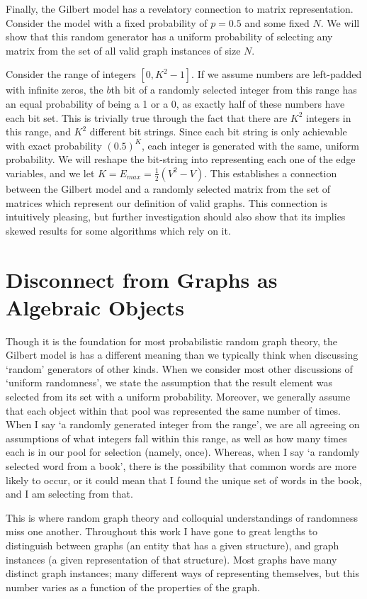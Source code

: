 \documentclass[11pt,a4paper]{report}
\begin{document}
Finally, the Gilbert model has a revelatory connection to matrix representation.
Consider the model with a fixed probability of $p=0.5$ and some fixed $N$.
We will show that this random generator has a uniform probability of selecting any matrix from the set of all valid graph instances of size $N$.

Consider the range of integers $[0, K^2 - 1]$.
If we assume numbers are left-padded with infinite zeros, the $b$th bit of a randomly selected integer from this range has an equal probability of being a 1 or a 0, as exactly half of these numbers have each bit set.
This is trivially true through the fact that there are $K^2$ integers in this range, and $K^2$ different bit strings.
Since each bit string is only achievable with exact probability $(0.5)^K$, each integer is generated with the same, uniform probability.
We will reshape the bit-string into representing each one of the edge variables, and we let $K = E_{max} = \frac{1}{2}(V^2 - V)$.
This establishes a connection between the Gilbert model and a randomly selected matrix from the set of matrices which represent our definition of valid graphs. 
This connection is intuitively pleasing, but further investigation should also show that its implies skewed results for some algorithms which rely on it.

\section{Disconnect from Graphs as Algebraic Objects}

Though it is the foundation for most probabilistic random graph theory, the Gilbert model is has a different meaning than we typically think when discussing `random' generators of other kinds.
When we consider most other discussions of `uniform randomness', we state the assumption that the result element was selected from its set with a uniform probability.
Moreover, we generally assume that each object within that pool was represented the same number of times.
When I say `a randomly generated integer from the range', we are all agreeing on assumptions of what integers fall within this range, as well as how many times each is in our pool for selection (namely, once). 
Whereas, when I say `a randomly selected word from a book', there is the possibility that common words are more likely to occur, or it could mean that I found the unique set of words in the book, and I am selecting from that.

This is where random graph theory and colloquial understandings of randomness miss one another.
Throughout this work I have gone to great lengths to distinguish between graphs (an entity that has a given structure), and graph instances (a given representation of that structure).
Most graphs have many distinct graph instances; many different ways of representing themselves, but this number varies as a function of the properties of the graph.
\end{document}
